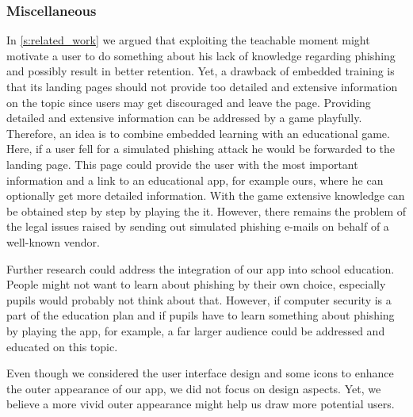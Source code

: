 \subsubsection{Miscellaneous}
\begin{description}[leftmargin=0cm]
\item[Combination of Embedded Training and Education Application:] In \autoref{s:related_work} we argued that exploiting the teachable moment might motivate a user to do something about his lack of knowledge regarding phishing and possibly result in better retention.
	Yet, a drawback of embedded training is that its landing pages should not provide too detailed and extensive information on the topic since users may get discouraged and leave the page.
	Providing detailed and extensive information can be addressed by a game playfully.
	Therefore, an idea is to combine embedded learning with an educational game.
	Here, if a user fell for a simulated phishing attack he would be forwarded to the landing page.
	This page could provide the user with the most important information and a link to an educational app, for example ours, where he can optionally get more detailed information.
	With the game extensive knowledge can be obtained step by step by playing the it.
However, there remains the problem of the legal issues raised by sending out simulated phishing e-mails on behalf of a well-known vendor.

\item[Integration of App into School Education]
Further research could address the integration of our app into school education.
People might not want to learn about phishing by their own choice, especially pupils would probably not think about that.
However, if computer security is a part of the education plan and if pupils have to learn something about phishing by playing the app, for example, a far larger audience could be addressed and educated on this topic.

\item[More Appealing Outer Appearance]
Even though we considered the user interface design and some icons to enhance the outer appearance of our app, we did not focus on design aspects.
Yet, we believe a more vivid outer appearance might help us draw more potential users.
\end{description}

